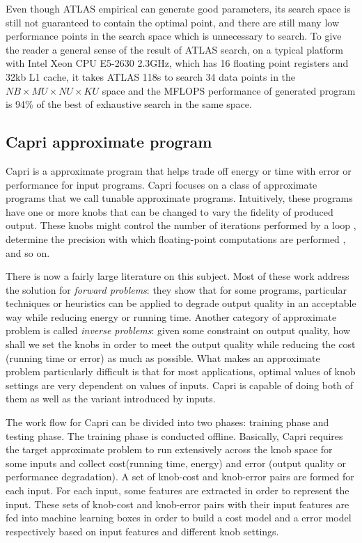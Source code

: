   Even though ATLAS empirical can generate good parameters, its search space is still not guaranteed to contain
  the optimal point, and there are still many low performance points in the search space which is unnecessary
  to search. To give the reader a general sense of the result of ATLAS search, on a typical platform with Intel Xeon
  CPU E5-2630 2.3GHz, which has 16 floating point registers and 32kb L1 cache, it takes ATLAS 118s to search 34 data
  points in the $NB\times MU \times NU \times KU$ space and the MFLOPS performance of generated program is 94\% of the
  best of exhaustive search in the same space.


  \subsection{Capri approximate program}
  \label{sec:Capri_intro}
  Capri is a approximate program that helps trade off energy or time with error
  or performance for input programs. Capri focuses on a class of approximate
  programs that we call tunable approximate programs. Intuitively, these
  programs have one or more knobs that can be changed to vary the fidelity of
  produced output. These knobs might control the number of iterations performed
  by a loop \cite{bottou2010large, rinard2007using}, determine the precision with which floating-point
  computations are performed \cite{rubio2013precimonious, schkufza2014stochastic}, and so on.

  There is now a fairly large literature on this subject. Most of these work
  address the solution for \emph{forward problems}: they show that for some
  programs, particular techniques or heuristics can be applied to degrade
  output quality in an acceptable way while reducing energy or running time.
  Another category of approximate problem is called \emph{
  inverse problems}: given some constraint on output quality, how shall we set
  the knobs in order to meet the output quality while reducing the cost (running
  time or error) as much as possible. What makes an approximate problem
  particularly difficult is that for most applications, optimal values of
  knob settings are very dependent on values of inputs. Capri is capable of
  doing both of them as well as the variant introduced by inputs.

  The work flow for Capri can be divided into two phases: training
  phase and testing phase. The training phase is conducted
  offline. Basically, Capri requires the target approximate problem to run
  extensively across the knob space for some inputs and collect cost(running
  time, energy) and error (output quality or performance degradation). A set of
  knob-cost and knob-error pairs are formed for each input. For each input, some
  features are extracted in order to represent the input. These sets of
  knob-cost and knob-error pairs with their input features are fed into
  machine learning boxes in order to build a cost model and a error model
  respectively based on input features and different knob settings.

